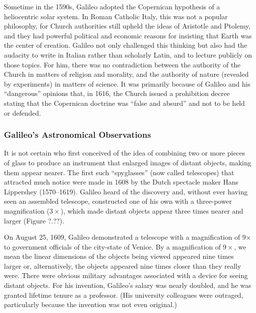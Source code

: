 \documentclass[main.tex]{subfiles}
\begin{document}
\vspace{1em}

Sometime in the 1590s, Galileo adopted the Copernican hypothesis of a heliocentric solar system. In Roman Catholic Italy, this was not a popular philosophy, for Church authorities still upheld the ideas of Aristotle and Ptolemy, and they had powerful political and economic reasons for insisting that Earth was the center of creation. Galileo not only challenged this thinking but also had the audacity to write in Italian rather than scholarly Latin, and to lecture publicly on those topics. For him, there was no contradiction between the authority of the Church in matters of religion and morality, and the authority of nature (revealed by experiments) in matters of science. It was primarily because of Galileo and his ``dangerous'' opinions that, in 1616, the Church issued a prohibition decree stating that the Copernican doctrine was ``false and absurd'' and not to be held or defended.

\subsubsection*{Galileo's Astronomical Observations}

It is not certain who first conceived of the idea of combining two or more pieces of glass to produce an instrument that enlarged images of distant objects, making them appear nearer. The first such ``spyglasses'' (now called telescopes) that attracted much notice were made in 1608 by the Dutch spectacle maker Hans Lippershey (1570--1619). Galileo heard of the discovery and, without ever having seen an assembled telescope, constructed one of his own with a three-power magnification ($3\times$), which made distant objects appear three times nearer and larger (Figure ?.??).

\vspace{1em} %

On August 25, 1609, Galileo demonstrated a telescope with a magnification of 9× to government officials of the city-state of Venice. By a magnification of $9\times$, we mean the linear dimensions of the objects being viewed appeared nine times larger or, alternatively, the objects appeared nine times closer than they really were. There were obvious military advantages associated with a device for seeing distant objects. For his invention, Galileo's salary was nearly doubled, and he was granted lifetime tenure as a professor. (His university colleagues were outraged, particularly because the invention was not even original.)
\end{document}
